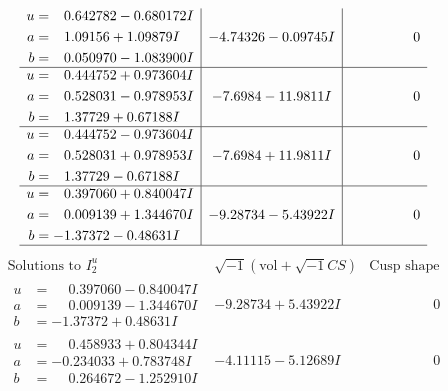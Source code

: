 \documentclass[1p]{elsarticle_modified}
\theoremstyle{definition}
\newcommand{\I}{\sqrt{-1}}
\begin{document}
$$\begin{array}{c|c|c}
\begin{aligned}
u &= \phantom{-}0.642782 - 0.680172 I \\
a &= \phantom{-}1.09156 + 1.09879 I \\
b &= \phantom{-}0.050970 - 1.083900 I\end{aligned}
 & -4.74326 - 0.09745 I & \phantom{-0.000000 } 0 \\ \hline\begin{aligned}
u &= \phantom{-}0.444752 + 0.973604 I \\
a &= \phantom{-}0.528031 - 0.978953 I \\
b &= \phantom{-}1.37729 + 0.67188 I\end{aligned}
 & -7.6984 - 11.9811 I & \phantom{-0.000000 } 0 \\ \hline\begin{aligned}
u &= \phantom{-}0.444752 - 0.973604 I \\
a &= \phantom{-}0.528031 + 0.978953 I \\
b &= \phantom{-}1.37729 - 0.67188 I\end{aligned}
 & -7.6984 + 11.9811 I & \phantom{-0.000000 } 0 \\ \hline\begin{aligned}
u &= \phantom{-}0.397060 + 0.840047 I \\
a &= \phantom{-}0.009139 + 1.344670 I \\
b &= -1.37372 - 0.48631 I\end{aligned}
 & -9.28734 - 5.43922 I & \phantom{-0.000000 } 0\\
 \hline 
 \end{array}$$\newpage$$\begin{array}{c|c|c}  
\text{Solutions to }I^u_{2}& \I (\text{vol} + \sqrt{-1}CS) & \text{Cusp shape}\\
 \hline 
\begin{aligned}
u &= \phantom{-}0.397060 - 0.840047 I \\
a &= \phantom{-}0.009139 - 1.344670 I \\
b &= -1.37372 + 0.48631 I\end{aligned}
 & -9.28734 + 5.43922 I & \phantom{-0.000000 } 0 \\ \hline\begin{aligned}
u &= \phantom{-}0.458933 + 0.804344 I \\
a &= -0.234033 + 0.783748 I \\
b &= \phantom{-}0.264672 - 1.252910 I\end{aligned}
 & -4.11115 - 5.12689 I & \phantom{-0.000000 } 0 \\ \hline\begin{aligned}

\end{aligned}
\end{array}$$
\end{document}
